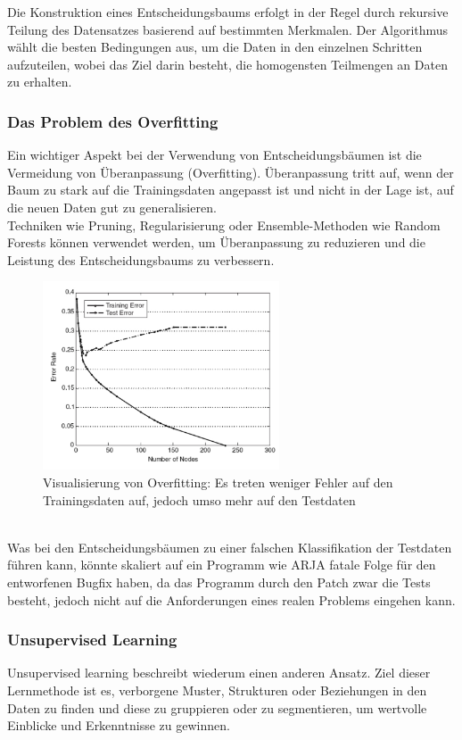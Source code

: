 \documentclass[11pt,a4paper]{article}
\begin{document}
Die Konstruktion eines Entscheidungsbaums erfolgt in der Regel durch rekursive Teilung des Datensatzes basierend auf bestimmten Merkmalen. Der Algorithmus wählt die besten Bedingungen aus, um die Daten in den einzelnen Schritten aufzuteilen, wobei das Ziel darin besteht, die homogensten Teilmengen an Daten zu erhalten.
\subsubsection{Das Problem des Overfitting}
Ein wichtiger Aspekt bei der Verwendung von Entscheidungsbäumen ist die Vermeidung von Überanpassung (Overfitting). Überanpassung tritt auf, wenn der Baum zu stark auf die Trainingsdaten angepasst ist und nicht in der Lage ist, auf die neuen Daten gut zu generalisieren.  \\Techniken wie Pruning, Regularisierung oder Ensemble-Methoden wie Random Forests können verwendet werden, um Überanpassung zu reduzieren und die Leistung des Entscheidungsbaums zu verbessern.
\begin{figure}[h!]
\includegraphics[width=70mm,scale=0.3, center]{overfitting.png}
\caption{Visualisierung von Overfitting: Es treten weniger Fehler auf den Trainingsdaten auf, jedoch umso mehr auf den Testdaten}
\label{fig:figure3}
\end{figure}
\\Was bei den Entscheidungsbäumen zu einer falschen Klassifikation der Testdaten führen kann, könnte skaliert auf ein Programm wie ARJA fatale Folge für den entworfenen Bugfix haben, da das Programm durch den Patch zwar die Tests besteht, jedoch nicht auf die Anforderungen eines realen Problems eingehen kann. 

\subsubsection{Unsupervised Learning}
Unsupervised learning beschreibt wiederum einen anderen Ansatz. Ziel dieser Lernmethode ist es, verborgene Muster, Strukturen oder Beziehungen in den Daten zu finden und diese zu gruppieren oder zu segmentieren, um wertvolle Einblicke und Erkenntnisse zu gewinnen. 
\end{document}
